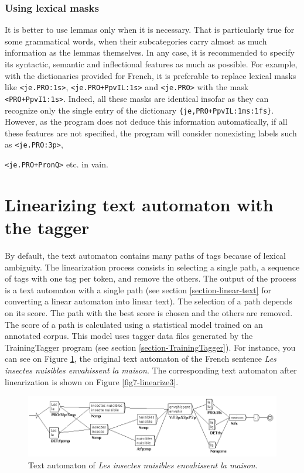 \subsubsection{Using lexical masks}

It is better to use lemmas only when it is necessary. That is particularly true
for some grammatical words, when their subcategories carry almost as much
information as the lemmas themselves. In any case, it is recommended to specify
its syntactic, semantic and inflectional features as much as possible. For
example, with the dictionaries provided for French, it is preferable to replace
lexical masks like \verb$<je.PRO:1s>$, \verb$<je.PRO+PpvIL:1s>$ and \verb$<je.PRO>$
with the mask \verb$<PRO+PpvI1:1s>$. Indeed, all these masks are identical
insofar as they can recognize only the single entry of the dictionary
\verb${je,PRO+PpvIL:1ms:1fs}$. However, as the program does not deduce this
information automatically, if all these features are not specified, the program
will consider nonexisting labels such as \verb$<je.PRO:3p>$, 

\noindent \verb$<je.PRO+PronQ>$ etc. in vain.


\section{Linearizing text automaton with the tagger}
\label{section-linearization}
By default, the text automaton contains many paths of tags because of lexical ambiguity.
The linearization process consists in 
selecting a single path, a sequence of tags with one tag per token, and remove the others. 
The output of the process is a text automaton with a single path (see section \ref{section-linear-text}
for converting a linear automaton into linear text). The selection of a path depends on its score.
The path with the best score is chosen 
and the others are removed. The score of a path is calculated using a statistical model trained
on an annotated corpus. This model uses tagger data files generated by the TrainingTagger program 
(see section \ref{section-TrainingTagger}). 
For instance, you can see on Figure \ref{fig7-linearize2}, the original text automaton of the French sentence 
\textit{Les insectes nuisibles envahissent la maison}. The corresponding text automaton after linearization is 
shown on Figure \ref{fig7-linearize3}.

\begin{figure}[!ht]
\begin{center}
\includegraphics[width=16cm]{resources/img/fig7-linearize2.png}
\caption{Text automaton of \textit{Les insectes nuisibles envahissent la maison.}\label{fig7-linearize2}}
\end{center}
\end{figure}

